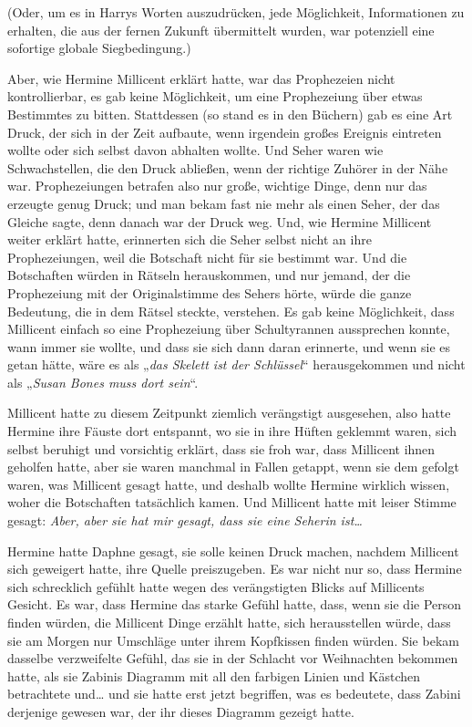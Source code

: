 {(Oder, um es in Harrys Worten auszudrücken, jede Möglichkeit, Informationen zu erhalten, die aus der fernen Zukunft übermittelt wurden, war potenziell eine sofortige globale Siegbedingung.)

Aber, wie Hermine Millicent erklärt hatte, war das Prophezeien nicht kontrollierbar, es gab keine Möglichkeit, um eine Prophezeiung über etwas Bestimmtes zu bitten. Stattdessen (so stand es in den Büchern) gab es eine Art Druck, der sich in der Zeit aufbaute, wenn irgendein großes Ereignis eintreten wollte oder sich selbst davon abhalten wollte. Und Seher waren wie Schwachstellen, die den Druck abließen, wenn der richtige Zuhörer in der Nähe war. Prophezeiungen betrafen also nur große, wichtige Dinge, denn nur das erzeugte genug Druck; und man bekam fast nie mehr als einen Seher, der das Gleiche sagte, denn danach war der Druck weg. Und, wie Hermine Millicent weiter erklärt hatte, erinnerten sich die Seher selbst nicht an ihre Prophezeiungen, weil die Botschaft nicht für sie bestimmt war. Und die Botschaften würden in Rätseln herauskommen, und nur jemand, der die Prophezeiung mit der Originalstimme des Sehers hörte, würde die ganze Bedeutung, die in dem Rätsel steckte, verstehen. Es gab keine Möglichkeit, dass Millicent einfach so eine Prophezeiung über Schultyrannen aussprechen konnte, wann immer sie wollte, und dass sie sich dann daran erinnerte, und wenn sie es getan hätte, wäre es als „\emph{das Skelett ist der Schlüssel}“ herausgekommen und nicht als „\emph{Susan Bones muss dort sein}“.

Millicent hatte zu diesem Zeitpunkt ziemlich verängstigt ausgesehen, also hatte Hermine ihre Fäuste dort entspannt, wo sie in ihre Hüften geklemmt waren, sich selbst beruhigt und vorsichtig erklärt, dass sie froh war, dass Millicent ihnen geholfen hatte, aber sie waren manchmal in Fallen getappt, wenn sie dem gefolgt waren, was Millicent gesagt hatte, und deshalb wollte Hermine wirklich wissen, woher die Botschaften tatsächlich kamen. Und Millicent hatte mit leiser Stimme gesagt: \emph{Aber, aber sie hat mir gesagt, dass sie eine Seherin ist…}

Hermine hatte Daphne gesagt, sie solle keinen Druck machen, nachdem Millicent sich geweigert hatte, ihre Quelle preiszugeben. Es war nicht nur so, dass Hermine sich schrecklich gefühlt hatte wegen des verängstigten Blicks auf Millicents Gesicht. Es war, dass Hermine das starke Gefühl hatte, dass, wenn sie die Person finden würden, die Millicent Dinge erzählt hatte, sich herausstellen würde, dass sie am Morgen nur Umschläge unter ihrem Kopfkissen finden würden. Sie bekam dasselbe verzweifelte Gefühl, das sie in der Schlacht vor Weihnachten bekommen hatte, als sie Zabinis Diagramm mit all den farbigen Linien und Kästchen betrachtete und… und sie hatte erst jetzt begriffen, was es bedeutete, dass Zabini derjenige gewesen war, der ihr dieses Diagramm gezeigt hatte.

}
